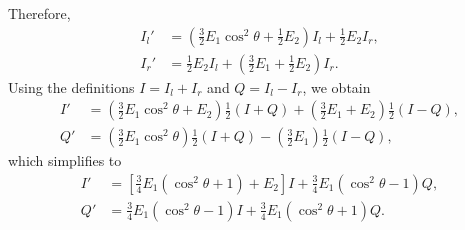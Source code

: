 \documentclass[english,a4paper]{my_memo}
\begin{document}
Therefore,
\begin{align*}
I_{l}' & =\left(\tfrac{3}{2}E_{1}\cos^{2}\theta+\tfrac{1}{2}E_{2}\right)I_{l}+\tfrac{1}{2}E_{2}I_{r},\\
I_{r}' & =\tfrac{1}{2}E_{2}I_{l}+\left(\tfrac{3}{2}E_{1}+\tfrac{1}{2}E_{2}\right)I_{r}.
\end{align*}
Using the definitions $I = I_{l}+I_{r}$ and $Q = I_{l}-I_{r}$, we
obtain
\begin{align*}
I' & =\left(\tfrac{3}{2}E_{1}\cos^{2}\theta+E_{2}\right)\tfrac{1}{2}\!\left(I+Q\right)+\left(\tfrac{3}{2}E_{1}+E_{2}\right)\tfrac{1}{2}\!\left(I-Q\right),\\
Q' & =\left(\tfrac{3}{2}E_{1}\cos^{2}\theta\right)\tfrac{1}{2}\!\left(I+Q\right)-\left(\tfrac{3}{2}E_{1}\right)\tfrac{1}{2}\!\left(I-Q\right),
\end{align*}
which simplifies to
\begin{align*}
I' & =\left[\tfrac{3}{4}E_{1}\!\left(\cos^{2}\theta+1\right)+E_{2}\right]I+\tfrac{3}{4}E_{1}\!\left(\cos^{2}\theta-1\right)Q,\\
Q' & =\tfrac{3}{4}E_{1}\!\left(\cos^{2}\theta-1\right)I+\tfrac{3}{4}E_{1}\!\left(\cos^{2}\theta+1\right)Q.
\end{align*}
\end{document}
